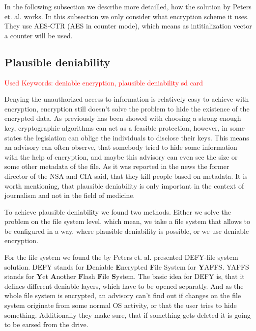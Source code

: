 \documentclass[12pt,a4paper,titlepage,oneside]{scrartcl}
\newcommand\todo[1]{\textcolor{red}{#1}}
\begin{document}
In the following subsection we describe more detailled, how the solution by Peters et. al. works.
In this subsection we only consider what encryption scheme it uses.
They use AES-CTR (AES in counter mode), which means as intitialization vector a counter will be used. \cite{peters2015defy}

\subsection{Plausible deniability}
\todo{Used Keywords: deniable encryption, plausible deniability sd card}

Denying the unauthorized access to information is relatively easy to achieve with encryption, encryption still doesn't solve the problem to hide the existence of the encrypted data.
As previously has been showed with choosing a strong enough key, cryptographic algorithms can act as a feasible protection, however, in some states the legislation can oblige the individuals to disclose their keys.
This means an advisory can often observe, that somebody tried to hide some information with the help of encryption, and maybe this advisory can even see the size or some other metadata of the file.
As it was reported in the news the former director of the NSA and CIA said, that they kill people based on metadata. \cite{coleMetadata}
It is worth mentioning, that plausible deniability is only important in the context of journalism and not in the field of medicine.

To achieve plausible deniability we found two methods.
Either we solve the problem on the file system level, which mean, we take a file system that allows to be configured in a way, where plausible deniability is possible, or we use deniable encryption.

For the file system we found the by Peters et. al. presented DEFY-file system solution.
DEFY stands for \textbf{D}eniable \textbf{E}ncrypted \textbf{F}ile System for \textbf{Y}AFFS.
YAFFS stands for \textbf{Y}et \textbf{A}nother \textbf{F}lash \textbf{F}ile \textbf{S}ystem.
The basic idea for DEFY is, that it defines different deniable layers, which have to be opened separatly.
And as the whole file system is encrypted, an advisory can't find out if changes on the file system originate from some normal OS activity, or that the user tries to hide something.
Additionally they make sure, that if something gets deleted it is going to be earsed from the drive. \cite{peters2015defy}
\end{document}
